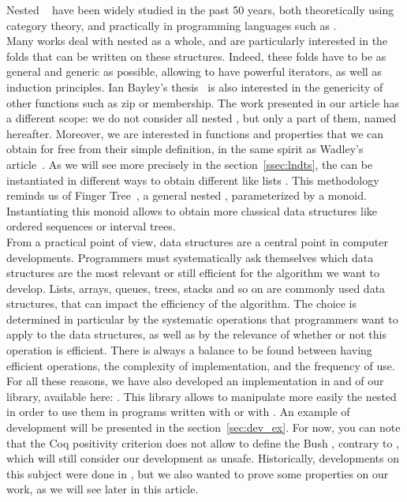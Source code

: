 \documentclass[a4paper,UKenglish,cleveref, autoref, thm-restate]{lipics}
\begin{document}
Nested \datatypes~\cite{bird_meertens_nested} have been widely studied in the past 50 years, both theoretically using category theory, and practically in programming languages such as \haskell. \\
Many works deal with nested \datatypes as a whole, and are particularly interested in the folds that can be written on these structures.
Indeed, these folds have to be as general and generic as possible, allowing to have powerful iterators, as well as induction principles.
Ian Bayley's thesis~\cite{thesis_bayley} is also interested in the genericity of other functions such as zip or membership.
The work presented in our article has a different scope: we do not consider all nested \datatypes, but only a part of them, named \textbf{\linearsFull} hereafter. Moreover, we are interested in functions and properties that we can obtain for free from their simple definition, in the same spirit  as Wadley's article~\cite{th_for_free}.
As we will see more precisely in the section~\ref{ssec:lndts}, the \linearsFull can be instantiated in different ways to obtain different \datatypes like lists . This methodology reminds us of Finger Tree~\cite{hinze_paterson_2006}, a general nested \datatype, parameterized by a monoid. Instantiating this monoid allows to obtain more classical data structures like ordered sequences or interval trees. \\
 From a practical point of view, data structures are a central point in computer developments. Programmers must systematically ask themselves which data structures are the most relevant or still efficient for the algorithm we want to develop. Lists, arrays, queues, trees, stacks and so on are commonly used data structures, that can impact the efficiency of the algorithm.
The choice is determined in particular by the systematic operations that programmers want to apply to the data structures, as well as by the relevance of whether or not this operation is efficient. There is always a balance to be found between having efficient operations, the complexity of implementation, and the frequency of use.
For all these reasons, we have also developed an implementation in \agda and \coq of our library, available here: \gitURL.
This library allows to manipulate more easily the nested \datatypes in order to use them in programs written with \agda or with \coq. An example of development will be presented in the section~\ref{sec:dev_ex}.
For now, you can note that the Coq positivity criterion does not allow to define the Bush \datatype, contrary to \agda, which will still consider our development as unsafe.
Historically, developments on this subject were done in \haskell, but we also wanted to prove some properties on our work, as we will see later in this article. \\
\end{document}
